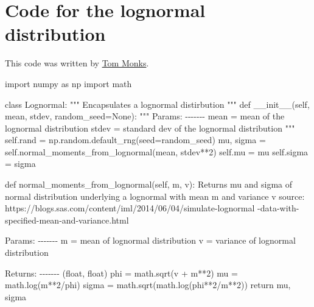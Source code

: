 \documentclass[
  letterpaper,
  DIV=11,
  numbers=noendperiod]{scrreprt}
\newenvironment{Shaded}{\begin{snugshade}}{\end{snugshade}}
\newcommand{\CommentTok}[1]{\textcolor[rgb]{0.37,0.37,0.37}{#1}}
\newcommand{\ControlFlowTok}[1]{\textcolor[rgb]{0.00,0.23,0.31}{#1}}
\newcommand{\DecValTok}[1]{\textcolor[rgb]{0.68,0.00,0.00}{#1}}
\newcommand{\FunctionTok}[1]{\textcolor[rgb]{0.28,0.35,0.67}{#1}}
\newcommand{\ImportTok}[1]{\textcolor[rgb]{0.00,0.46,0.62}{#1}}
\newcommand{\KeywordTok}[1]{\textcolor[rgb]{0.00,0.23,0.31}{#1}}
\newcommand{\NormalTok}[1]{\textcolor[rgb]{0.00,0.23,0.31}{#1}}
\newcommand{\OperatorTok}[1]{\textcolor[rgb]{0.37,0.37,0.37}{#1}}
\newcommand{\VariableTok}[1]{\textcolor[rgb]{0.07,0.07,0.07}{#1}}
\begin{document}
\section{Code for the lognormal
distribution}\label{code-for-the-lognormal-distribution}

This code was written by
\href{https://orcid.org/0000-0003-2631-4481}{Tom Monks}.

\begin{Shaded}
\begin{Highlighting}[]
\ImportTok{import}\NormalTok{ numpy }\ImportTok{as}\NormalTok{ np}
\ImportTok{import}\NormalTok{ math}

\KeywordTok{class}\NormalTok{ Lognormal:}
    \CommentTok{"""}
\CommentTok{    Encapsulates a lognormal distirbution}
\CommentTok{    """}
    \KeywordTok{def} \FunctionTok{\_\_init\_\_}\NormalTok{(}\VariableTok{self}\NormalTok{, mean, stdev, random\_seed}\OperatorTok{=}\VariableTok{None}\NormalTok{):}
        \CommentTok{"""}
\CommentTok{        Params:}
\CommentTok{        {-}{-}{-}{-}{-}{-}{-}}
\CommentTok{        mean = mean of the lognormal distribution}
\CommentTok{        stdev = standard dev of the lognormal distribution}
\CommentTok{        """}
        \VariableTok{self}\NormalTok{.rand }\OperatorTok{=}\NormalTok{ np.random.default\_rng(seed}\OperatorTok{=}\NormalTok{random\_seed)}
\NormalTok{        mu, sigma }\OperatorTok{=} \VariableTok{self}\NormalTok{.normal\_moments\_from\_lognormal(mean, stdev}\OperatorTok{**}\DecValTok{2}\NormalTok{)}
        \VariableTok{self}\NormalTok{.mu }\OperatorTok{=}\NormalTok{ mu}
        \VariableTok{self}\NormalTok{.sigma }\OperatorTok{=}\NormalTok{ sigma}

    \KeywordTok{def}\NormalTok{ normal\_moments\_from\_lognormal(}\VariableTok{self}\NormalTok{, m, v):}
        \CommentTok{\textquotesingle{}\textquotesingle{}\textquotesingle{}}
\CommentTok{        Returns mu and sigma of normal distribution}
\CommentTok{        underlying a lognormal with mean m and variance v}
\CommentTok{        source: https://blogs.sas.com/content/iml/2014/06/04/simulate{-}lognormal}
\CommentTok{        {-}data{-}with{-}specified{-}mean{-}and{-}variance.html}

\CommentTok{        Params:}
\CommentTok{        {-}{-}{-}{-}{-}{-}{-}}
\CommentTok{        m = mean of lognormal distribution}
\CommentTok{        v = variance of lognormal distribution}

\CommentTok{        Returns:}
\CommentTok{        {-}{-}{-}{-}{-}{-}{-}}
\CommentTok{        (float, float)}
\CommentTok{        \textquotesingle{}\textquotesingle{}\textquotesingle{}}
\NormalTok{        phi }\OperatorTok{=}\NormalTok{ math.sqrt(v }\OperatorTok{+}\NormalTok{ m}\OperatorTok{**}\DecValTok{2}\NormalTok{)}
\NormalTok{        mu }\OperatorTok{=}\NormalTok{ math.log(m}\OperatorTok{**}\DecValTok{2}\OperatorTok{/}\NormalTok{phi)}
\NormalTok{        sigma }\OperatorTok{=}\NormalTok{ math.sqrt(math.log(phi}\OperatorTok{**}\DecValTok{2}\OperatorTok{/}\NormalTok{m}\OperatorTok{**}\DecValTok{2}\NormalTok{))}
        \ControlFlowTok{return}\NormalTok{ mu, sigma}


\end{Highlighting}
\end{Shaded}
\end{document}
